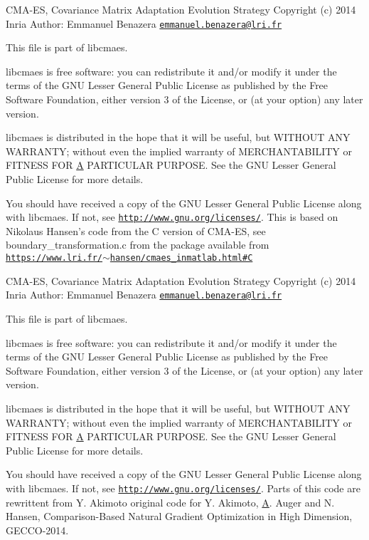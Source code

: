 C\+M\+A-\/\+E\+S, Covariance Matrix Adaptation Evolution Strategy Copyright (c) 2014 Inria Author\+: Emmanuel Benazera \href{mailto:emmanuel.benazera@lri.fr}{\tt emmanuel.\+benazera@lri.\+fr}

This file is part of libcmaes.

libcmaes is free software\+: you can redistribute it and/or modify it under the terms of the G\+N\+U Lesser General Public License as published by the Free Software Foundation, either version 3 of the License, or (at your option) any later version.

libcmaes is distributed in the hope that it will be useful, but W\+I\+T\+H\+O\+U\+T A\+N\+Y W\+A\+R\+R\+A\+N\+T\+Y; without even the implied warranty of M\+E\+R\+C\+H\+A\+N\+T\+A\+B\+I\+L\+I\+T\+Y or F\+I\+T\+N\+E\+S\+S F\+O\+R \hyperlink{classA}{A} P\+A\+R\+T\+I\+C\+U\+L\+A\+R P\+U\+R\+P\+O\+S\+E. See the G\+N\+U Lesser General Public License for more details.

You should have received a copy of the G\+N\+U Lesser General Public License along with libcmaes. If not, see \href{http://www.gnu.org/licenses/}{\tt http\+://www.\+gnu.\+org/licenses/}. This is based on Nikolaus Hansen's code from the C version of C\+M\+A-\/\+E\+S, see boundary\+\_\+transformation.\+c from the package available from \href{https://www.lri.fr/~hansen/cmaes_inmatlab.html#C}{\tt https\+://www.\+lri.\+fr/$\sim$hansen/cmaes\+\_\+inmatlab.\+html\#\+C}

C\+M\+A-\/\+E\+S, Covariance Matrix Adaptation Evolution Strategy Copyright (c) 2014 Inria Author\+: Emmanuel Benazera \href{mailto:emmanuel.benazera@lri.fr}{\tt emmanuel.\+benazera@lri.\+fr}

This file is part of libcmaes.

libcmaes is free software\+: you can redistribute it and/or modify it under the terms of the G\+N\+U Lesser General Public License as published by the Free Software Foundation, either version 3 of the License, or (at your option) any later version.

libcmaes is distributed in the hope that it will be useful, but W\+I\+T\+H\+O\+U\+T A\+N\+Y W\+A\+R\+R\+A\+N\+T\+Y; without even the implied warranty of M\+E\+R\+C\+H\+A\+N\+T\+A\+B\+I\+L\+I\+T\+Y or F\+I\+T\+N\+E\+S\+S F\+O\+R \hyperlink{classA}{A} P\+A\+R\+T\+I\+C\+U\+L\+A\+R P\+U\+R\+P\+O\+S\+E. See the G\+N\+U Lesser General Public License for more details.

You should have received a copy of the G\+N\+U Lesser General Public License along with libcmaes. If not, see \href{http://www.gnu.org/licenses/}{\tt http\+://www.\+gnu.\+org/licenses/}. Parts of this code are rewrittent from Y. Akimoto original code for Y. Akimoto, \hyperlink{classA}{A}. Auger and N. Hansen, Comparison-\/\+Based Natural Gradient Optimization in High Dimension, G\+E\+C\+C\+O-\/2014. 

